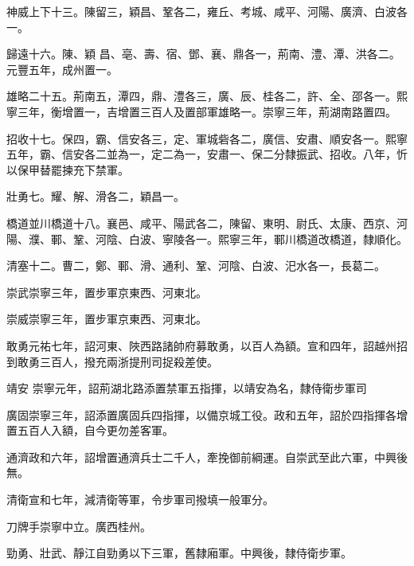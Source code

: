 \begin{pinyinscope}
 神威上下十三。陳留三，穎昌、鞏各二，雍丘、考城、咸平、河陽、廣濟、白波各一。



 歸遠十六。陳、穎
 昌、亳、壽、宿、鄧、襄、鼎各一，荊南、澧、潭、洪各二。元豐五年，成州置一。



 雄略二十五。荊南五，潭四，鼎、澧各三，廣、辰、桂各二，許、全、邵各一。熙寧三年，衡增置一，吉增置三百人及置部軍雄略一。崇寧三年，荊湖南路置四。



 招收十七。保四，霸、信安各三，定、軍城砦各二，廣信、安肅、順安各一。熙寧五年，霸、信安各二並為一，定二為一，安肅一、保二分隸振武、招收。八年，忻以保甲替罷揀充下禁軍。



 壯勇七。耀、解、滑各二，穎昌一。



 橋道並川橋道十八。襄邑、咸平、陽武各二，陳留、東明、尉氏、太康、西京、河陽、濮、鄆、鞏、河陰、白波、寧陵各一。熙寧三年，鄆川橋道改橋道，隸順化。



 清塞十二。曹二，鄭、鄆、滑、通利、鞏、河陰、白波、汜水各一，長葛二。



 崇武崇寧三年，置步軍京東西、河東北。



 崇威崇寧三年，置步軍京東西、河東北。



 敢勇元祐七年，詔河東、陜西路諸帥府募敢勇，以百人為額。宣和四年，詔越州招到敢勇三百人，撥充兩浙提刑司捉殺差使。



 靖安
 崇寧元年，詔荊湖北路添置禁軍五指揮，以靖安為名，隸侍衛步軍司



 廣固崇寧三年，詔添置廣固兵四指揮，以備京城工役。政和五年，詔於四指揮各增置五百人入額，自今更勿差客軍。



 通濟政和六年，詔增置通濟兵士二千人，牽挽御前綱運。自崇武至此六軍，中興後無。



 清衛宣和七年，減清衛等軍，令步軍司撥填一般軍分。



 刀牌手崇寧中立。廣西桂州。



 勁勇、壯武、靜江自勁勇以下三軍，舊隸廂軍。中興後，隸侍衛步軍。




\end{pinyinscope}
